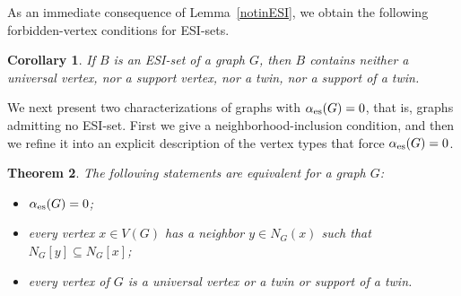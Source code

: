 \documentclass[11pt]{article}
\newtheorem{theorem}{Theorem}
\newtheorem{corollary}[theorem]{Corollary}
\newcommand{\es}{\alpha_{\rm es}}
\begin{document}
As an immediate consequence of Lemma~\ref{notinESI}, we obtain the following forbidden-vertex
conditions for ESI-sets.

\begin{corollary}
\label{notESI1}
If $B$ is an ESI-set of a graph $G$, then $B$ contains neither a universal vertex, nor a
support vertex, nor a twin, nor a support of a twin.
\end{corollary}

We next present two characterizations of graphs with $\es(G)=0$, that is, graphs admitting no ESI-set.
First we give a neighborhood-inclusion condition, and then we refine it into an explicit description of the
vertex types that force $\es(G)=0$.

\begin{theorem}
\label{zero}
The following statements are equivalent for a graph $G$:
\begin{itemize}
\item[(i)] $\es(G)=0$;
\item[(ii)] every vertex $x\in V(G)$ has a neighbor $y\in N_G(x)$ such that $N_G[y]\subseteq N_G[x]$;
\item[(iii)] every vertex of $G$ is a universal vertex or a twin or support of a twin. 
\end{itemize}
\end{theorem}
\end{document}
